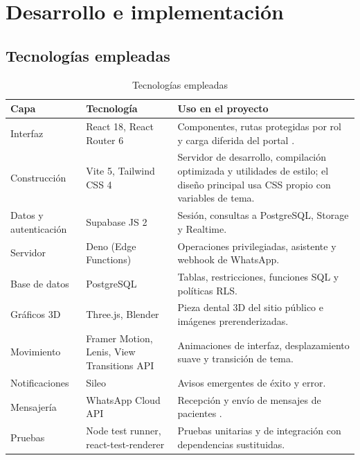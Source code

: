 \documentclass[11pt]{article}
\begin{document}
\section{Desarrollo e implementación}

\subsection{Tecnologías empleadas}

\begin{table}[H]
\centering\small
\caption{Tecnologías empleadas}\label{tab:tecnologias}
\begin{tabularx}{\linewidth}{@{}P{3cm}P{3.6cm}L@{}}
\toprule
\textbf{Capa} & \textbf{Tecnología} & \textbf{Uso en el proyecto} \\
\midrule
Interfaz & React 18, React Router 6 & Componentes, rutas protegidas por rol y carga diferida del portal \parencite{react2026}. \\
Construcción & Vite 5, Tailwind CSS 4 & Servidor de desarrollo, compilación optimizada y utilidades de estilo; el diseño principal usa CSS propio con variables de tema. \\
Datos y autenticación & Supabase JS 2 & Sesión, consultas a PostgreSQL, Storage y Realtime. \\
Servidor & Deno (Edge Functions) & Operaciones privilegiadas, asistente y webhook de WhatsApp. \\
Base de datos & PostgreSQL & Tablas, restricciones, funciones SQL y políticas RLS. \\
Gráficos 3D & Three.js, Blender & Pieza dental 3D del sitio público e imágenes prerenderizadas. \\
Movimiento & Framer Motion, Lenis, View Transitions API & Animaciones de interfaz, desplazamiento suave y transición de tema. \\
Notificaciones & Sileo & Avisos emergentes de éxito y error. \\
Mensajería & WhatsApp Cloud API & Recepción y envío de mensajes de pacientes \parencite{meta2026}. \\
Pruebas & Node test runner, react-test-renderer & Pruebas unitarias y de integración con dependencias sustituidas. \\
\bottomrule
\end{tabularx}
\end{table}
\end{document}
